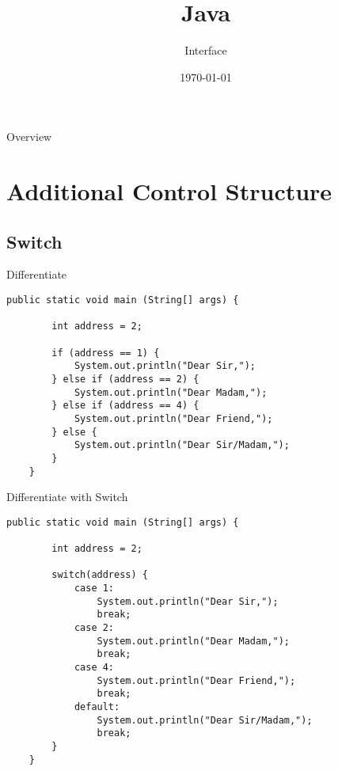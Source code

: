 


\title{Java}
\subtitle{Interface}
\date{\today}



\begin{frame}
\titlepage
\end{frame}

\begin{frame}{Overview}
\tableofcontents
\end{frame}

\section{Additional Control Structure}
\subsection{Switch}
\begin{frame}[fragile]{Differentiate}
	\begin{lstlisting}[basicstyle=\ttfamily\scriptsize]
	public static void main (String[] args) {
	
	    int address = 2;
	    	
	    if (address == 1) {
	        System.out.println("Dear Sir,");	    
	    } else if (address == 2) {
	        System.out.println("Dear Madam,");		    
	    } else if (address == 4) {
	        System.out.println("Dear Friend,");		    
	    } else {
	        System.out.println("Dear Sir/Madam,");	
	    }
	}
	\end{lstlisting}
\end{frame}
\begin{frame}[fragile]{Differentiate with Switch}
	\begin{lstlisting}[basicstyle=\ttfamily\scriptsize]
	public static void main (String[] args) {
	
	    int address = 2;
	    
	    switch(address) {
	        case 1:
	            System.out.println("Dear Sir,");
	            break;
	        case 2:
	            System.out.println("Dear Madam,");
	            break;
	        case 4:
	            System.out.println("Dear Friend,");
	            break; 
	        default:
	            System.out.println("Dear Sir/Madam,");
	            break;
	    }
	}
	\end{lstlisting}
\end{frame}
